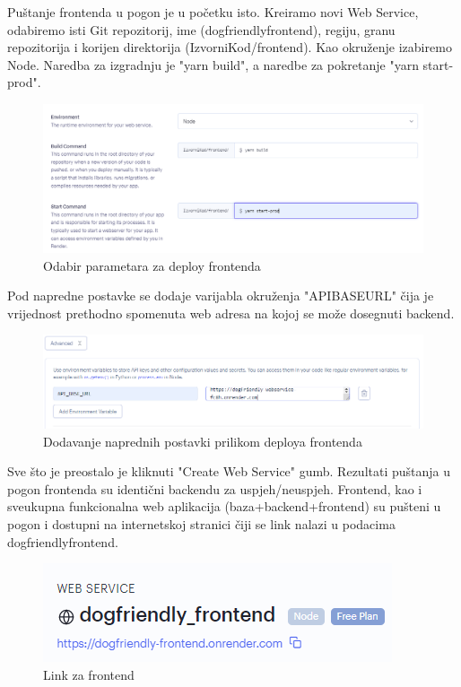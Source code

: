             Puštanje frontenda u pogon je u početku isto. Kreiramo novi Web Service, odabiremo isti Git repozitorij, ime (dogfriendly\textunderscore frontend), regiju, granu repozitorija i korijen direktorija (IzvorniKod/frontend).
            Kao okruženje izabiremo Node. Naredba za izgradnju je "yarn build", a naredbe za pokretanje "yarn start-prod".
            \begin{figure}[H]
			    \includegraphics[width=\textwidth]{slike/deploy8.png} 
			        \caption{Odabir parametara za deploy frontenda}
			    \label{fig:Odabir parametara za deploy frontenda}
		    \end{figure}
            Pod napredne postavke se dodaje varijabla okruženja "API\textunderscore BASE\textunderscore URL" čija je vrijednost prethodno spomenuta web adresa na kojoj se može dosegnuti backend.
            \begin{figure}[H]
			    \includegraphics[width=\textwidth]{slike/deploy9.png} 
			        \caption{Dodavanje naprednih postavki prilikom deploya frontenda}
			    \label{fig:Dodavanje naprednih postavki prilikom deploya frontenda}
		    \end{figure}
            Sve što je preostalo je kliknuti "Create Web Service" gumb. Rezultati puštanja u pogon frontenda su identični backendu za uspjeh/neuspjeh.
		  Frontend, kao i sveukupna funkcionalna web aplikacija (baza+backend+frontend) su pušteni u pogon i dostupni na internetskoj stranici čiji se link nalazi u podacima dogfriendly\textunderscore frontend.
            \begin{figure}[H]
			    \includegraphics[width=\textwidth]{slike/deploy10.png} 
			        \caption{Link za frontend}
			    \label{fig:Link za frontend}
		    \end{figure}

